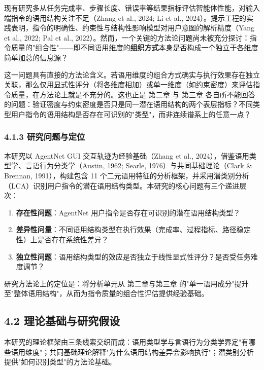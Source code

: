 \documentclass[12pt,a4paper,openany,oneside]{ctexrep}
\begin{document}
现有研究多从任务完成率、步骤长度、错误率等结果指标评估智能体性能，对输入端指令的语用结构关注不足（Zhang et al., 2024; Li et al., 2024）。提示工程的实践表明，指令的明确性、约束性与结构性影响模型对用户意图的解析精度（Yang et al., 2022; Pal et al., 2022）。然而，一个关键的方法论问题尚未被充分探讨：指令质量的"组合性"——即不同语用维度的\textbf{组织方式}本身是否构成一个独立于各维度简单加总的信息源？

这一问题具有直接的方法论含义。若语用维度的组合方式确实与执行效果存在独立关联，那么仅用显式性评分（将各维度相加）或单一维度（如约束密度）来评估指令质量，在方法论上就是不充分的。这也正是 第二章 与 第三章 各自所不能回答的问题：验证密度与约束密度是否只是同一潜在语用结构的两个表层指标？不同类型用户指令的语用结构是否存在可识别的"类型"，而非连续谱系上的任意一点？

\subsubsection{4.1.3 研究问题与定位}


本研究以 AgentNet GUI 交互轨迹为经验基础（Zhang et al., 2024），借鉴语用类型学、言语行为分类学（Austin, 1962; Searle, 1976）与共同基础理论（Clark \& Brennan, 1991），构建包含 11 个二元语用特征的分析框架，并采用潜类别分析（LCA）识别用户指令的潜在语用结构类型。本研究的核心问题有三个递进层次：

\begin{enumerate}
\item[1.] \textbf{存在性问题}：AgentNet 用户指令是否存在可识别的潜在语用结构类型？
\item[2.] \textbf{差异性问量}：不同语用结构类型在执行效果（完成率、过程指标、路径稳定性）上是否存在系统性差异？
\item[3.] \textbf{独立性问题}：语用结构类型的效应是否独立于线性显式性评分？是否受任务难度调节？
\end{enumerate}


研究方法论上的定位是：将分析单元从 第二章与第三章 的"单一语用成分"提升至"整体语用结构"，从而为指令质量的组合性评估提供经验基础。

\subsection{4.2 理论基础与研究假设}


本研究的理论框架由三条线索交织而成：语用类型学与言语行为分类学界定"有哪些语用维度"；共同基础理论解释"为什么语用结构差异会影响执行"；潜类别分析提供"如何识别类型"的方法论基础。
\end{document}
